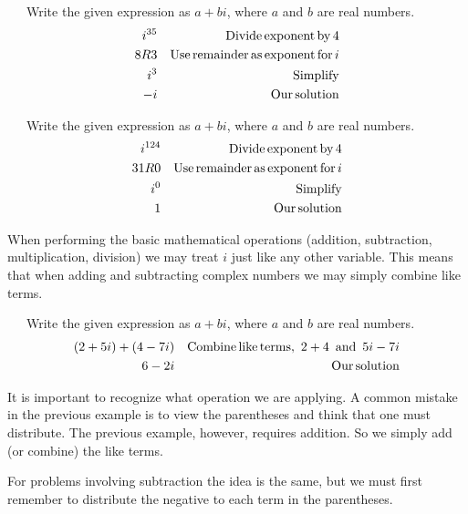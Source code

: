 \begin{example}~~~Write the given expression as $a+bi$, where $a$ and $b$ are real numbers.
  \begin{eqnarray*}
    i^{35} &  & \operatorname{Divide} \operatorname{exponent} \operatorname{by} 4\\
    8 R 3 &  & \operatorname{Use} \operatorname{remainder} \operatorname{as} \operatorname{exponent} \operatorname{for}
    i\\
    i^3 &  & \operatorname{Simplify}\\
    - i &  & \operatorname{Our} \operatorname{solution}
  \end{eqnarray*}
\end{example}
  
\begin{example}~~~Write the given expression as $a+bi$, where $a$ and $b$ are real numbers.
  \begin{eqnarray*}
    i^{124} &  & \operatorname{Divide} \operatorname{exponent} \operatorname{by} 4\\
    31 R 0 &  & \operatorname{Use} \operatorname{remainder} \operatorname{as} \operatorname{exponent}
    \operatorname{for} i\\
    i^0 &  & \operatorname{Simplify}\\
    1 &  & \operatorname{Our} \operatorname{solution}
  \end{eqnarray*}
\end{example}

When performing the basic mathematical operations (addition, subtraction, multiplication, division) we may treat $i$
just like any other variable. This means that when adding and subtracting
complex numbers we may simply combine like terms. %

\begin{example}~~~Write the given expression as $a+bi$, where $a$ and $b$ are real numbers.
  \begin{eqnarray*}
    (2 + 5 i) + (4 - 7 i) &  & \operatorname{Combine} \operatorname{like} \operatorname{terms,~} 2 + 4
    \operatorname{~and~} 5 i - 7 i\\
    6 - 2 i &  & \operatorname{Our} \operatorname{solution}
  \end{eqnarray*}
\end{example}

It is important to recognize what operation we are applying. A common mistake in the previous example is to view the
parentheses and think that one must 
distribute.  The previous example, however, requires addition.  So we simply add (or combine) the like terms.\pp

For problems involving subtraction the idea is the same, but we must first remember to
distribute the negative to each term in the parentheses.

